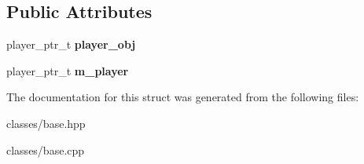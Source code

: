\subsection*{Public Attributes}
\begin{DoxyCompactItemize}
\item 
\mbox{\label{structmods_1_1classes_1_1base_a97b7eeb23e6744f15127cad9ba6c4ac2}} 
player\+\_\+ptr\+\_\+t {\bfseries player\+\_\+obj}
\item 
\mbox{\label{structmods_1_1classes_1_1base_a6b052bb875728abaed591351b8cb79f2}} 
player\+\_\+ptr\+\_\+t {\bfseries m\+\_\+player}
\end{DoxyCompactItemize}


The documentation for this struct was generated from the following files\+:\begin{DoxyCompactItemize}
\item 
classes/base.\+hpp\item 
classes/base.\+cpp\end{DoxyCompactItemize}

